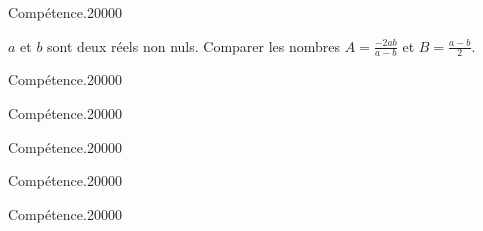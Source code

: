 
\begin{pageParcoursd} %

\begin{ExoCdN}{Compétence.}{2}{0}{0}{0}{0}
 
$a$ et $b$ sont deux réels non nuls. Comparer les nombres $A = \frac{-2ab}{a-b}$ et $B=\frac{a-b}{2}$.
 
\end{ExoCdN}

\begin{ExoCdN}{Compétence.}{2}{0}{0}{0}{0}

\end{ExoCdN}

\begin{ExoCdN}{Compétence.}{2}{0}{0}{0}{0}

\end{ExoCdN}

\begin{ExoCdN}{Compétence.}{2}{0}{0}{0}{0}

\end{ExoCdN}

\begin{ExoCdN}{Compétence.}{2}{0}{0}{0}{0}

\end{ExoCdN}

\begin{ExoCdN}{Compétence.}{2}{0}{0}{0}{0}

\end{ExoCdN}

\end{pageParcoursd} %


